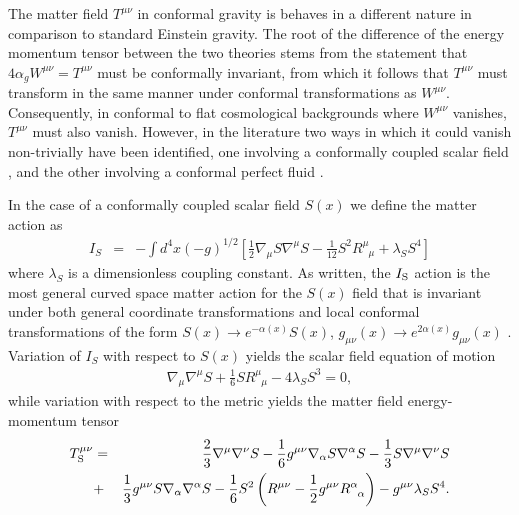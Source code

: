 The matter field $T^{\mu\nu}$ in conformal gravity is behaves in a different nature in comparison to standard Einstein gravity. The root of the difference of the energy momentum tensor between the two theories stems from the statement that $4\alpha_gW^{\mu\nu}=T^{\mu\nu}$ must be conformally invariant, from which it follows that $T^{\mu\nu}$ must transform in the same manner under conformal transformations as $W^{\mu\nu}$. Consequently, in conformal to flat cosmological backgrounds where $W^{\mu\nu}$ vanishes, $T^{\mu\nu}$ must also vanish. However, in the literature two ways in which it could vanish non-trivially have been identified, one involving a conformally coupled scalar field \cite{mannheim_1990}, and the other involving a conformal perfect fluid \cite{mannheim_2000}.

In the case of a conformally coupled scalar field $S(x)$ we define the matter action as
%                                                                               
\begin{eqnarray}
I_S&=&-\int d^4x(-g)^{1/2}\left[\frac{1}{2}\nabla_{\mu}S
\nabla^{\mu}S-\frac{1}{12}S^2R^\mu_{\phantom         
	{\mu}\mu}+\lambda_S S^4\right]
\label{AP32}
\end{eqnarray}                                 
% 
where  $\lambda_S$ is a dimensionless coupling constant. As written, the $I_{\rm S}$ action is the most general curved space matter action for the $S(x)$ field that is invariant under both general coordinate transformations and local conformal transformations of the form
$S(x)\rightarrow e^{-\alpha(x)}S(x)$,  $g_{\mu\nu}(x)\rightarrow e^{2\alpha(x)}g_{\mu\nu}(x)$ \cite{mannheim_1990}. Variation of $I_S$ with respect to  $S(x)$ yields the scalar field equation of motion
%                                                                               
\begin{eqnarray}
\nabla_{\mu}\nabla^{\mu}S+\frac{1}{6}SR^\mu_{\phantom{\mu}\mu}
-4\lambda_S S^3=0,
\label{AP33}
\end{eqnarray}                                 
%                                                               
while variation with respect to the metric yields the matter field energy-momentum tensor 
%                                                                               
\begin{eqnarray}
T_{\rm S}^{\mu \nu}&=&\frac{2}{3}\nabla^{\mu} \nabla^{\nu} S
-\frac{1}{6}g^{\mu\nu}\nabla_{\alpha}S\nabla^{\alpha}S
-\frac{1}{3}S\nabla^{\mu}\nabla^{\nu}S
\nonumber \\             
&+&\frac{1}{3}g^{\mu\nu}S\nabla_{\alpha}\nabla^{\alpha}S                           
-\frac{1}{6}S^2\left(R^{\mu\nu}
-\frac{1}{2}g^{\mu\nu}R^\alpha_{\phantom{\alpha}\alpha}\right)-g^{\mu\nu}\lambda_S S^4. 
\label{AP34}
\end{eqnarray}                                 
